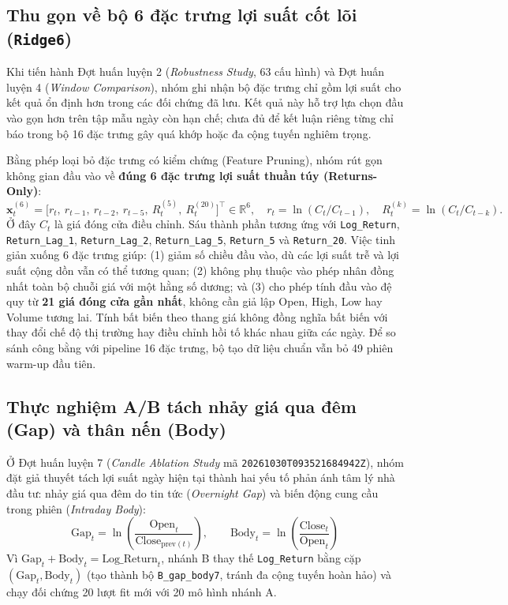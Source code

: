 \documentclass[12pt,a4paper]{report}
\begin{document}
\subsection{Thu gọn về bộ 6 đặc trưng lợi suất cốt lõi (\texttt{Ridge6})}
Khi tiến hành Đợt huấn luyện 2 (\textit{Robustness Study}, 63 cấu hình) và Đợt huấn luyện 4 (\textit{Window Comparison}), nhóm ghi nhận bộ đặc trưng chỉ gồm lợi suất cho kết quả ổn định hơn trong các đối chứng đã lưu. Kết quả này hỗ trợ lựa chọn đầu vào gọn hơn trên tập mẫu ngày còn hạn chế; chưa đủ để kết luận riêng từng chỉ báo trong bộ 16 đặc trưng gây quá khớp hoặc đa cộng tuyến nghiêm trọng.

Bằng phép loại bỏ đặc trưng có kiểm chứng (Feature Pruning), nhóm rút gọn không gian đầu vào về \textbf{đúng 6 đặc trưng lợi suất thuần túy (Returns-Only)}:
\begin{equation}
    \mathbf{x}_t^{(6)}
        = \bigl[r_t,\ r_{t-1},\ r_{t-2},\ r_{t-5},\ R_t^{(5)},\ R_t^{(20)}\bigr]^\top
        \in \mathbb{R}^6,
    \quad r_t=\ln(C_t/C_{t-1}),\quad R_t^{(k)}=\ln(C_t/C_{t-k}).
\end{equation}
Ở đây $C_t$ là giá đóng cửa điều chỉnh. Sáu thành phần tương ứng với
\nolinkurl{Log_Return}, \nolinkurl{Return_Lag_1}, \nolinkurl{Return_Lag_2},
\nolinkurl{Return_Lag_5}, \nolinkurl{Return_5} và \nolinkurl{Return_20}.
Việc tinh giản xuống 6 đặc trưng giúp: (1) giảm số chiều đầu vào, dù các lợi suất trễ và lợi suất cộng dồn vẫn có thể tương quan; (2) không phụ thuộc vào phép nhân đồng nhất toàn bộ chuỗi giá với một hằng số dương; và (3) cho phép tính đầu vào đệ quy từ \textbf{21 giá đóng cửa gần nhất}, không cần giả lập Open, High, Low hay Volume tương lai. Tính bất biến theo thang giá không đồng nghĩa bất biến với thay đổi chế độ thị trường hay điều chỉnh hồi tố khác nhau giữa các ngày. Để so sánh công bằng với pipeline 16 đặc trưng, bộ tạo dữ liệu chuẩn vẫn bỏ 49 phiên warm-up đầu tiên.

\subsection{Thực nghiệm A/B tách nhảy giá qua đêm (Gap) và thân nến (Body)}
Ở Đợt huấn luyện 7 (\textit{Candle Ablation Study} mã \texttt{20261030T\-093521684942Z}), nhóm đặt giả thuyết tách lợi suất ngày hiện tại thành hai yếu tố phản ánh tâm lý nhà đầu tư: nhảy giá qua đêm do tin tức (\textit{Overnight Gap}) và biến động cung cầu trong phiên (\textit{Intraday Body}):
\begin{equation}
    \text{Gap}_t = \ln\left(\frac{\text{Open}_t}{\text{Close}_{\text{prev}(t)}}\right), \qquad \text{Body}_t = \ln\left(\frac{\text{Close}_t}{\text{Open}_t}\right)
\end{equation}
Vì $\text{Gap}_t + \text{Body}_t = \text{Log\_Return}_t$, nhánh B thay thế \nolinkurl{Log_Return} bằng cặp $(\text{Gap}_t, \text{Body}_t)$ (tạo thành bộ \nolinkurl{B_gap_body7}, tránh đa cộng tuyến hoàn hảo) và chạy đối chứng 20 lượt fit mới với 20 mô hình nhánh A.
\end{document}
